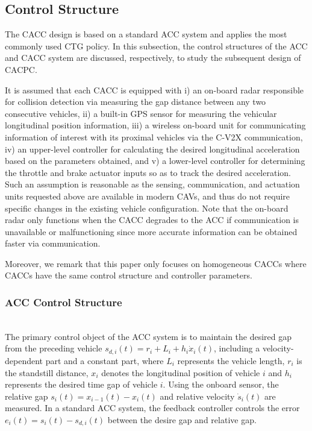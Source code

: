 \documentclass[journal]{IEEEtran}
\begin{document}
\subsection{Control Structure}
\label{Section 2.3}
The CACC design is based on a standard ACC system and applies the most commonly used CTG policy. In this subsection, the control structures of the ACC and CACC system are discussed, respectively, to study the subsequent design of CACPC.

It is assumed that each CACC is equipped with i) an on-board radar responsible for collision detection via measuring the gap distance between any two consecutive vehicles, ii) a built-in GPS sensor for measuring the vehicular longitudinal position information, iii) a wireless on-board unit for communicating information of interest with its proximal vehicles via the C-V2X communication, iv) an upper-level controller for calculating the desired longitudinal acceleration based on the parameters obtained, and v) a lower-level controller for determining the throttle and brake actuator inputs so as to track the desired acceleration. Such an assumption is reasonable as the sensing, communication, and actuation units requested above are available in modern CAVs, and thus do not require specific changes in the existing vehicle configuration. Note that the on-board radar only functions when the CACC degrades to the ACC if communication is unavailable or malfunctioning since more accurate information can be obtained faster via communication.

Moreover, we remark that this paper only focuses on homogeneous CACCs where CACCs have the same control structure and controller parameters.


\subsubsection{ACC Control Structure}
\label{Section 2.3.1}
~\\

The primary control object of the ACC system is to maintain the desired gap from the preceding vehicle $s_{d, i}(t)=r_{i}+L_{i}+h_{i} \dot{x}_{i}(t)$, including a velocity-dependent part and a constant part, where $L_i$ represents the vehicle length, $r_i$ is the standstill distance, $x_i$ denotes the longitudinal position of vehicle $i$ and $h_i$ represents the desired time gap of vehicle $i$. Using the onboard sensor, the relative gap $s_{i}(t)=x_{i-1}(t)-x_{i}(t)$ and relative velocity $\dot{s}_{i} (t)$ are measured. In a standard ACC system, the feedback controller controls the error $e_{i}(t)=s_{i}(t)-s_{d, i}(t)$ between the desire gap and relative gap.
\end{document}
